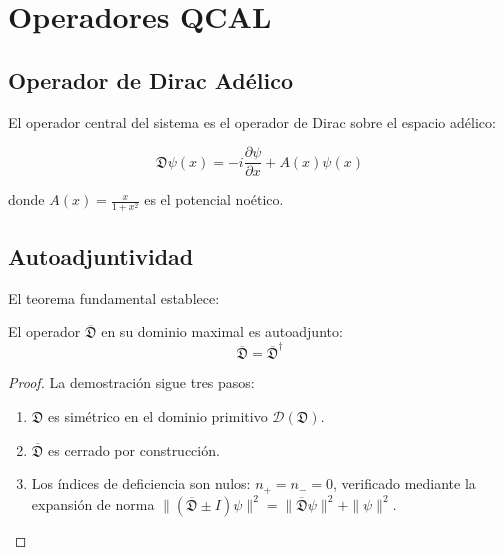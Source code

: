 \chapter{Operadores QCAL}

\section{Operador de Dirac Adélico}

El operador central del sistema es el operador de Dirac sobre el espacio adélico:

\[
\mathfrak{D} \psi(x) = -i \frac{\partial \psi}{\partial x} + A(x) \psi(x)
\]

donde $A(x) = \frac{x}{1+x^2}$ es el potencial noético.

\section{Autoadjuntividad}

El teorema fundamental establece:

\begin{theorem}
El operador $\overline{\mathfrak{D}}$ en su dominio maximal es autoadjunto:
\[
\overline{\mathfrak{D}} = \overline{\mathfrak{D}}^\dagger
\]
\end{theorem}

\begin{proof}
La demostración sigue tres pasos:
\begin{enumerate}
  \item $\mathfrak{D}$ es simétrico en el dominio primitivo $\mathcal{D}(\mathfrak{D})$.
  \item $\overline{\mathfrak{D}}$ es cerrado por construcción.
  \item Los índices de deficiencia son nulos: $n_+ = n_- = 0$, verificado mediante
        la expansión de norma $\|(\overline{\mathfrak{D}} \pm I)\psi\|^2 = \|\overline{\mathfrak{D}}\psi\|^2 + \|\psi\|^2$.
\end{enumerate}
\end{proof}
